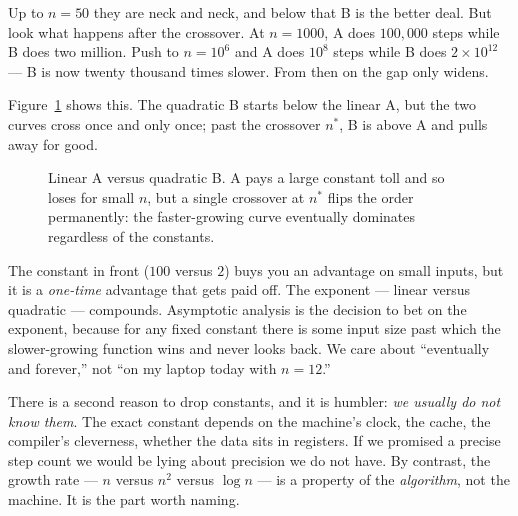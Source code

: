 Up to $n=50$ they are neck and neck, and below that B is the better deal. But look
what happens after the crossover. At $n=1000$, A does $100{,}000$ steps while B does
two million. Push to $n=10^6$ and A does $10^8$ steps while B does $2\times 10^{12}$
--- B is now twenty thousand times slower. From then on the gap only widens.

Figure~\ref{ch03:fig-crossover} shows this. The quadratic B starts below the linear
A, but the two curves cross once and only once; past the crossover $n^\ast$, B is above
A and pulls away for good.

\begin{figure}[H]
\centering
{}
\caption{Linear A versus quadratic B. A pays a large constant toll and so loses for small
$n$, but a single crossover at $n^\ast$ flips the order permanently: the faster-growing
curve eventually dominates regardless of the constants.}
\label{ch03:fig-crossover}
\end{figure}

\begin{intuitionbox}
The constant in front ($100$ versus $2$) buys you an advantage on small inputs,
but it is a \emph{one-time} advantage that gets paid off. The exponent --- linear
versus quadratic --- compounds. Asymptotic analysis is the decision to bet on the
exponent, because for any fixed constant there is some input size past which the
slower-growing function wins and never looks back. We care about ``eventually and
forever,'' not ``on my laptop today with $n=12$.''
\end{intuitionbox}

There is a second reason to drop constants, and it is humbler: \emph{we usually do
not know them}. The exact constant depends on the machine's clock, the cache, the
compiler's cleverness, whether the data sits in registers. If we promised a precise
step count we would be lying about precision we do not have. By contrast, the growth
rate --- $n$ versus $n^2$ versus $\log n$ --- is a property of the \emph{algorithm},
not the machine. It is the part worth naming.

